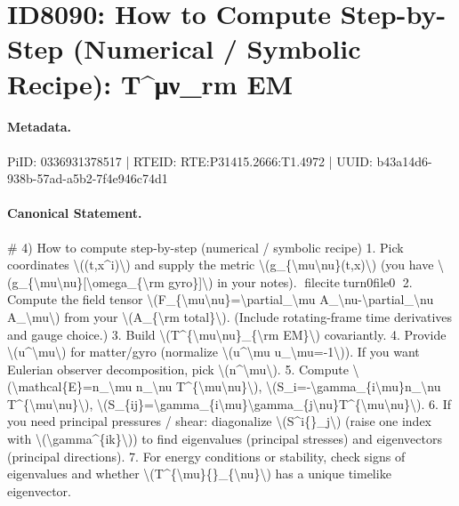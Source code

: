 \section*{ID8090: How to Compute Step-by-Step (Numerical / Symbolic Recipe): T\textasciicircum{}μν\_rm EM}
\paragraph{Metadata.}
PiID: 0336931378517 | RTEID: RTE:P31415.2666:T1.4972 | UUID: b43a14d6-938b-57ad-a5b2-7f4e946c74d1

\paragraph{Canonical Statement.}
\# 4) How to compute step-by-step (numerical / symbolic recipe) 1. Pick coordinates \textbackslash{}((t,x\textasciicircum{}i)\textbackslash{}) and supply the metric \textbackslash{}(g\_\{\textbackslash{}mu\textbackslash{}nu\}(t,x)\textbackslash{}) (you have \textbackslash{}(g\_\{\textbackslash{}mu\textbackslash{}nu\}[\textbackslash{}omega\_\{\textbackslash{}rm gyro\}]\textbackslash{}) in your notes). fileciteturn0file0 2. Compute the field tensor \textbackslash{}(F\_\{\textbackslash{}mu\textbackslash{}nu\}=\textbackslash{}partial\_\textbackslash{}mu A\_\textbackslash{}nu-\textbackslash{}partial\_\textbackslash{}nu A\_\textbackslash{}mu\textbackslash{}) from your \textbackslash{}(A\_\{\textbackslash{}rm total\}\textbackslash{}). (Include rotating-frame time derivatives and gauge choice.) 3. Build \textbackslash{}(T\textasciicircum{}\{\textbackslash{}mu\textbackslash{}nu\}\_\{\textbackslash{}rm EM\}\textbackslash{}) covariantly. 4. Provide \textbackslash{}(u\textasciicircum{}\textbackslash{}mu\textbackslash{}) for matter/gyro (normalize \textbackslash{}(u\textasciicircum{}\textbackslash{}mu u\_\textbackslash{}mu=-1\textbackslash{})). If you want Eulerian observer decomposition, pick \textbackslash{}(n\textasciicircum{}\textbackslash{}mu\textbackslash{}). 5. Compute \textbackslash{}(\textbackslash{}mathcal\{E\}=n\_\textbackslash{}mu n\_\textbackslash{}nu T\textasciicircum{}\{\textbackslash{}mu\textbackslash{}nu\}\textbackslash{}), \textbackslash{}(S\_i=-\textbackslash{}gamma\_\{i\textbackslash{}mu\}n\_\textbackslash{}nu T\textasciicircum{}\{\textbackslash{}mu\textbackslash{}nu\}\textbackslash{}), \textbackslash{}(S\_\{ij\}=\textbackslash{}gamma\_\{i\textbackslash{}mu\}\textbackslash{}gamma\_\{j\textbackslash{}nu\}T\textasciicircum{}\{\textbackslash{}mu\textbackslash{}nu\}\textbackslash{}). 6. If you need principal pressures / shear: diagonalize \textbackslash{}(S\textasciicircum{}i\{\}\_j\textbackslash{}) (raise one index with \textbackslash{}(\textbackslash{}gamma\textasciicircum{}\{ik\}\textbackslash{})) to find eigenvalues (principal stresses) and eigenvectors (principal directions). 7. For energy conditions or stability, check signs of eigenvalues and whether \textbackslash{}(T\textasciicircum{}\{\textbackslash{}mu\}\{\}\_\{\textbackslash{}nu\}\textbackslash{}) has a unique timelike eigenvector.

